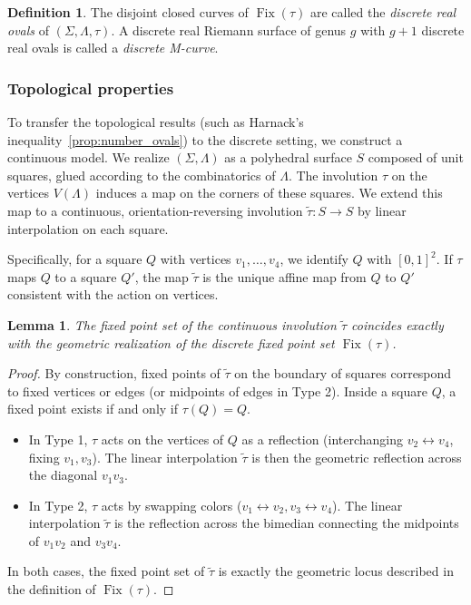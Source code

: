 \documentclass[11pt,a4paper]{article}
\newtheorem{lemma}[theorem]{Lemma}
\theoremstyle{definition}
\newtheorem*{definition}{Definition}
\DeclareMathOperator{\fix}{\mathrm{Fix}}
\begin{document}
\begin{definition}
	The disjoint closed curves of $\fix(\tau)$ are called the \emph{discrete real ovals} of $(\Sigma, \Lambda, \tau)$. A discrete real Riemann surface of genus $g$ with $g+1$ discrete real ovals is called a \emph{discrete M-curve}.
\end{definition}

\subsubsection*{Topological properties}

To transfer the topological results (such as Harnack's inequality~\ref{prop:number_ovals}) to the discrete setting, we construct a continuous model.
We realize $(\Sigma, \Lambda)$ as a polyhedral surface $S$ composed of unit squares, glued according to the combinatorics of $\Lambda$. The involution $\tau$ on the vertices $V(\Lambda)$ induces a map on the corners of these squares. We extend this map to a continuous, orientation-reversing involution $\tilde{\tau}: S \to S$ by linear interpolation on each square.

%	

Specifically, for a square $Q$ with vertices $v_1, \dots, v_4$, we identify $Q$ with $[0,1]^2$. If $\tau$ maps $Q$ to a square $Q'$, the map $\tilde{\tau}$ is the unique affine map from $Q$ to $Q'$ consistent with the action on vertices.

\begin{lemma}\label{lem:fixedtau}
	The fixed point set of the continuous involution $\tilde{\tau}$ coincides exactly with the geometric realization of the discrete fixed point set $\fix(\tau)$.
\end{lemma}

\begin{proof}
	By construction, fixed points of $\tilde{\tau}$ on the boundary of squares correspond to fixed vertices or edges (or midpoints of edges in Type 2). Inside a square $Q$, a fixed point exists if and only if $\tau(Q)=Q$.
	\begin{itemize}
		\item In Type 1, $\tau$ acts on the vertices of $Q$ as a reflection (interchanging $v_2 \leftrightarrow v_4$, fixing $v_1, v_3$). The linear interpolation $\tilde{\tau}$ is then the geometric reflection across the diagonal $v_1v_3$.
		\item In Type 2, $\tau$ acts by swapping colors ($v_1 \leftrightarrow v_2, v_3 \leftrightarrow v_4$). The linear interpolation $\tilde{\tau}$ is the reflection across the bimedian connecting the midpoints of $v_1v_2$ and $v_3v_4$.
	\end{itemize}
	In both cases, the fixed point set of $\tilde{\tau}$ is exactly the geometric locus described in the definition of $\fix(\tau)$.
\end{proof}
\end{document}
